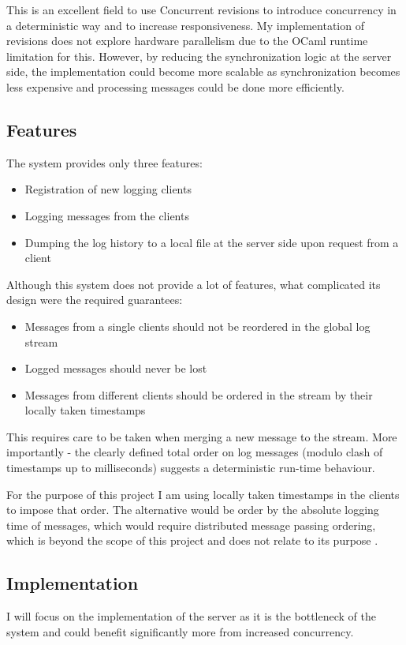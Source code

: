 \documentclass[12pt,twoside,notitlepage]{report}
\begin{document}
{{This is an excellent field to use Concurrent revisions to introduce concurrency in a deterministic way and to increase responsiveness. My implementation of revisions does not explore hardware parallelism due to the OCaml runtime limitation for this. However, by reducing the synchronization logic at the server side, the implementation could become more scalable as synchronization becomes less expensive and processing messages could be done more efficiently.

\subsection{Features}
The system provides only three features:
\begin{itemize}
\item
Registration of new logging clients
\item
Logging messages from the clients
\item
Dumping the log history to a local file at the server side upon request from a client
\end{itemize}

Although this system does not provide a lot of features, what complicated its design were the required guarantees:
\begin{itemize}
\item
Messages from a single clients should not be reordered in the global log stream
\item
Logged messages should never be lost
\item
Messages from different clients should be ordered in the stream by their locally taken timestamps
\end{itemize}

This requires care to be taken when merging a new message to the stream. More importantly - the clearly defined total order on log messages (modulo clash of timestamps up to milliseconds) suggests a deterministic run-time behaviour.

For the purpose of this project I am using locally taken timestamps in the clients to impose that order. The alternative would be order by the absolute logging time of messages, which would require distributed message passing ordering, which is beyond the scope of this project and does not relate to its purpose \cite{bacon}. 

\subsection{Implementation}
\label{log_imp}
I will focus on the implementation of the server as it is the bottleneck of the system and could benefit significantly more from increased concurrency.

}}
\end{document}
